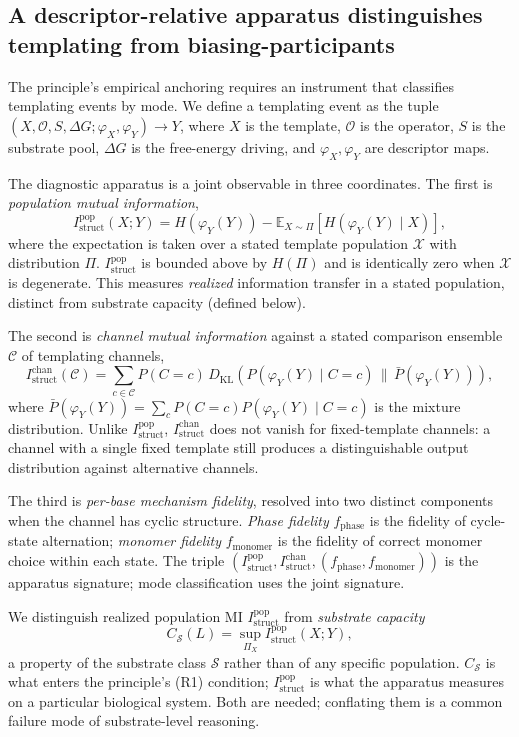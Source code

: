 \documentclass[aps,prx,reprint,amsmath,amssymb,floatfix,superscriptaddress,nofootinbib]{revtex4-2}
\theoremstyle{plain-thm}
\theoremstyle{definition-thm}
\newcommand{\Istructpop}{I_{\mathrm{struct}}^{\mathrm{pop}}}
\newcommand{\Istructchan}{I_{\mathrm{struct}}^{\mathrm{chan}}}
\newcommand{\fphase}{f_{\mathrm{phase}}}
\newcommand{\fmonomer}{f_{\mathrm{monomer}}}
\newcommand{\Csub}{C_{\mathcal{S}}}
\newcommand{\descX}{\varphi_X}
\newcommand{\descY}{\varphi_Y}
\newcommand{\KL}[2]{D_{\mathrm{KL}}\!\left(#1 \,\|\, #2\right)}
\newcommand{\Sset}{\mathcal{S}}
\newcommand{\Op}{\mathcal{O}}
\begin{document}
\subsection{A descriptor-relative apparatus distinguishes templating from biasing-participants}

The principle's empirical anchoring requires an instrument that classifies templating events by mode. We define a templating event as the tuple $(X, \Op, S, \Delta G; \descX, \descY) \to Y$, where $X$ is the template, $\Op$ is the operator, $S$ is the substrate pool, $\Delta G$ is the free-energy driving, and $\descX, \descY$ are descriptor maps.

The diagnostic apparatus is a joint observable in three coordinates. The first is \textit{population mutual information},
\begin{equation}
\Istructpop(X; Y) = H(\descY(Y)) - \mathbb{E}_{X \sim \Pi}\left[H(\descY(Y) \mid X)\right],
\end{equation}
where the expectation is taken over a stated template population $\mathcal{X}$ with distribution $\Pi$. $\Istructpop$ is bounded above by $H(\Pi)$ and is identically zero when $\mathcal{X}$ is degenerate. This measures \textit{realized} information transfer in a stated population, distinct from substrate capacity (defined below).

The second is \textit{channel mutual information} against a stated comparison ensemble $\mathcal{C}$ of templating channels,
\begin{equation}
\Istructchan(\mathcal{C}) = \sum_{c \in \mathcal{C}} P(C = c) \,\KL{P(\descY(Y) \mid C = c)}{\bar{P}(\descY(Y))},
\end{equation}
where $\bar{P}(\descY(Y)) = \sum_c P(C = c) P(\descY(Y) \mid C = c)$ is the mixture distribution. Unlike $\Istructpop$, $\Istructchan$ does not vanish for fixed-template channels: a channel with a single fixed template still produces a distinguishable output distribution against alternative channels.

The third is \textit{per-base mechanism fidelity}, resolved into two distinct components when the channel has cyclic structure. \textit{Phase fidelity} $\fphase$ is the fidelity of cycle-state alternation; \textit{monomer fidelity} $\fmonomer$ is the fidelity of correct monomer choice within each state. The triple $(\Istructpop, \Istructchan, (\fphase, \fmonomer))$ is the apparatus signature; mode classification uses the joint signature.

We distinguish realized population MI $\Istructpop$ from \textit{substrate capacity}
\begin{equation}
\Csub(L) = \sup_{\Pi_X} \Istructpop(X; Y),
\end{equation}
a property of the substrate class $\Sset$ rather than of any specific population. $\Csub$ is what enters the principle's (R1) condition; $\Istructpop$ is what the apparatus measures on a particular biological system. Both are needed; conflating them is a common failure mode of substrate-level reasoning.
\end{document}
